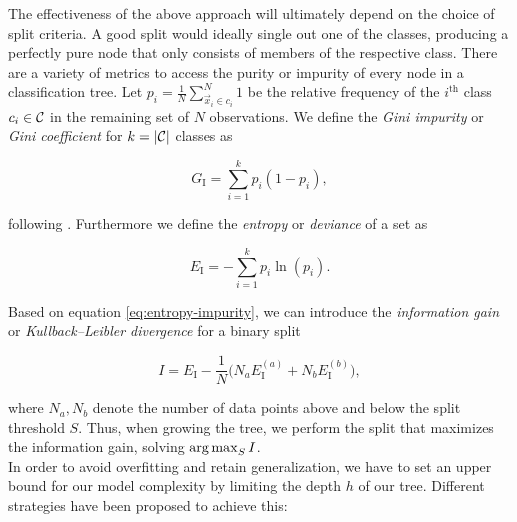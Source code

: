 The effectiveness of the above approach will ultimately depend on the choice of split criteria. A good split would ideally single out one of the classes, producing a perfectly pure node that only consists of members of the respective class. There are a variety of metrics to access the purity or impurity of every node in a classification tree. Let $p_i = \frac{1}{N} \sum\limits_{\vec x_i \in c_i}^N 1$ be the relative frequency of the $i^{\text{th}}$ class $c_i \in \mathcal{C}$ in the remaining set of $N$ observations. We define the \emph{Gini impurity} or \emph{Gini coefficient} for $k = |\mathcal{C}|$ classes as

\begin{equation}
\label{eq:gini-impurity}
G_{\text{I}} = \sum\limits_{i=1}^k p_i (1 - p_i),
\end{equation}

following \citet{astroML,hastie2001,ripley2007}. Furthermore we define the \emph{entropy} or \emph{deviance} of a set as

\begin{equation}
\label{eq:entropy-impurity}
E_{\text{I}} = - \sum\limits_{i=1}^k p_i \ln(p_i).
\end{equation}

Based on equation \eqref{eq:entropy-impurity}, we can introduce the \emph{information gain} or \emph{Kullback--Leibler divergence} \citep{kullback1951} for a binary split

\begin{equation}
\label{eq:information-gain}
I = E_{\text{I}} - \frac{1}{N} \big(N_a E_{\text{I}}^{(a)} + N_b E_{\text{I}}^{(b)}\big),
\end{equation}

where $N_a, N_b$ denote the number of data points above and below the split threshold $S$. Thus, when growing the tree, we perform the split that maximizes the information gain, \ie solving $\operatorname*{arg\,max}_S I$.\\


In order to avoid overfitting and retain generalization, we have to set an upper bound for our model complexity by limiting the depth $h$ of our tree. Different strategies have been proposed to achieve this:

